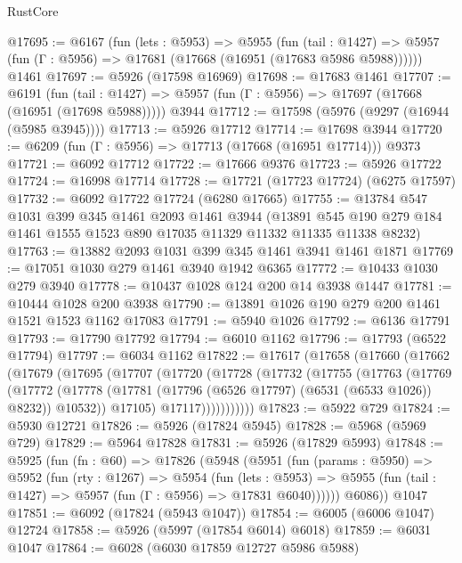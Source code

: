 \begin{lexlean}{RustCore}
\begin{coremodule}
@17695 := @6167
    (fun (lets : @5953) =>
    @5955
      (fun (tail : @1427) =>
      @5957 (fun (Γ : @5956) => @17681 (@17668 (@16951 (@17683 @5986 @5988))))))
    @1461
@17697 := @5926 (@17598 @16969)
@17698 := @17683 @1461
@17707 := @6191
    (fun (tail : @1427) => @5957 (fun (Γ : @5956) => @17697 (@17668 (@16951 (@17698 @5988)))))
    @3944
@17712 := @17598 (@5976 (@9297 (@16944 (@5985 @3945))))
@17713 := @5926 @17712
@17714 := @17698 @3944
@17720 := @6209 (fun (Γ : @5956) => @17713 (@17668 (@16951 @17714))) @9373
@17721 := @6092 @17712
@17722 := @17666 @9376
@17723 := @5926 @17722
@17724 := @16998 @17714
@17728 := @17721 (@17723 @17724) (@6275 @17597)
@17732 := @6092 @17722 @17724 (@6280 @17665)
@17755 := @13784
    @547
    @1031
    @399
    @345
    @1461
    @2093
    @1461
    @3944
    (@13891 @545 @190 @279 @184 @1461 @1555 @1523 @890 @17035 @11329 @11332 @11335 @11338 @8232)
@17763 := @13882 @2093 @1031 @399 @345 @1461 @3941 @1461 @1871
@17769 := @17051 @1030 @279 @1461 @3940 @1942 @6365
@17772 := @10433 @1030 @279 @3940
@17778 := @10437 @1028 @124 @200 @14 @3938 @1447
@17781 := @10444 @1028 @200 @3938
@17790 := @13891 @1026 @190 @279 @200 @1461 @1521 @1523 @1162 @17083
@17791 := @5940 @1026
@17792 := @6136 @17791
@17793 := @17790 @17792
@17794 := @6010 @1162
@17796 := @17793 (@6522 @17794)
@17797 := @6034 @1162
@17822 := @17617
    (@17658
      (@17660
        (@17662
          (@17679
            (@17695
              (@17707
                (@17720
                  (@17728
                    (@17732
                      (@17755
                        (@17763
                          (@17769
                            (@17772
                              (@17778
                                (@17781 (@17796 (@6526 @17797) (@6531 (@6533 @1026)) @8232))
                                @10532))
                            @17105)
                          @17117)))))))))))
@17823 := @5922 @729
@17824 := @5930 @12721
@17826 := @5926 (@17824 @5945)
@17828 := @5968 (@5969 @729)
@17829 := @5964 @17828
@17831 := @5926 (@17829 @5993)
@17848 := @5925
    (fun (fn : @60) =>
    @17826
      (@5948
        (@5951
          (fun (params : @5950) =>
          @5952
            (fun (rty : @1267) =>
            @5954
              (fun (lets : @5953) =>
              @5955 (fun (tail : @1427) => @5957 (fun (Γ : @5956) => @17831 @6040))))))
        @6086))
    @1047
@17851 := @6092 (@17824 (@5943 @1047))
@17854 := @6005 (@6006 @1047) @12724
@17858 := @5926 (@5997 (@17854 @6014) @6018)
@17859 := @6031 @1047
@17864 := @6028 (@6030 @17859 @12727 @5986 @5988)

\end{coremodule}
\end{lexlean}
